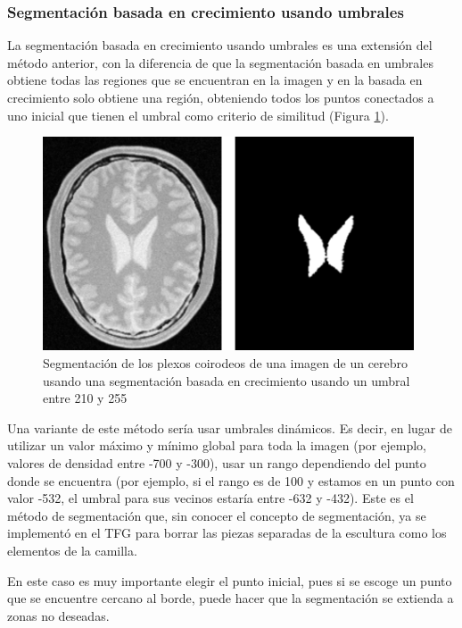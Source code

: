 \subsubsection{Segmentación basada en crecimiento usando umbrales}

La segmentación basada en crecimiento usando umbrales es una extensión del método anterior, con la diferencia de que la segmentación basada en umbrales obtiene todas las regiones que se encuentran en la imagen y en la basada en crecimiento solo obtiene una región, obteniendo todos los puntos conectados a uno inicial que tienen el umbral como criterio de similitud \cite{haralick85} (Figura \ref{fig:desarrollo/segmentacion-crecimiento-umbral}).

\begin{figure}[H]
	\centering
	\includegraphics[width=11cm]{imagenes/desarrollo/segmentacion-crecimiento-umbral}
	\caption{Segmentación de los plexos coirodeos de una imagen de un cerebro usando una segmentación basada en crecimiento usando un umbral entre 210 y 255}
	\label{fig:desarrollo/segmentacion-crecimiento-umbral}
\end{figure}

Una variante de este método sería usar umbrales dinámicos. Es decir, en lugar de utilizar un valor máximo y mínimo global para toda la imagen (por ejemplo, valores de densidad entre -700 y -300), usar un rango dependiendo del punto donde se encuentra (por ejemplo, si el rango es de 100 y estamos en un punto con valor -532, el umbral para sus vecinos estaría entre -632 y -432). Este es el método de segmentación que, sin conocer el concepto de segmentación, ya se implementó en el TFG para borrar las piezas separadas de la escultura como los elementos de la camilla.

En este caso es muy importante elegir el punto inicial, pues si se escoge un punto que se encuentre cercano al borde, puede hacer que la segmentación se extienda a zonas no deseadas.

